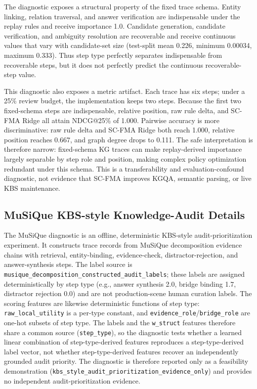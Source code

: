 \documentclass[a4paper,fleqn]{cas-sc}
\begin{document}
The diagnostic exposes a structural property of the fixed trace schema. Entity linking, relation traversal, and answer verification are indispensable under the replay rules and receive importance 1.0. Candidate generation, candidate verification, and ambiguity resolution are recoverable and receive continuous values that vary with candidate-set size (test-split mean 0.226, minimum 0.00034, maximum 0.333). Thus step type perfectly separates indispensable from recoverable steps, but it does not perfectly predict the continuous recoverable-step value.

This diagnostic also exposes a metric artifact. Each trace has six steps; under a 25\% review budget, the implementation keeps two steps. Because the first two fixed-schema steps are indispensable, relative position, raw rule delta, and SC-FMA Ridge all attain NDCG@25\% of 1.000. Pairwise accuracy is more discriminative: raw rule delta and SC-FMA Ridge both reach 1.000, relative position reaches 0.667, and graph degree drops to 0.111. The safe interpretation is therefore narrow: fixed-schema KG traces can make replay-derived importance largely separable by step role and position, making complex policy optimization redundant under this schema. This is a transferability and evaluation-confound diagnostic, not evidence that SC-FMA improves KGQA, semantic parsing, or live KBS maintenance.

\subsection{MuSiQue KBS-style Knowledge-Audit Details}
\label{app:musique-kbs-audit}

The MuSiQue diagnostic is an offline, deterministic KBS-style audit-prioritization experiment. It constructs trace records from MuSiQue decomposition evidence chains with retrieval, entity-binding, evidence-check, distractor-rejection, and answer-synthesis steps. The label source is \texttt{musique\_decomposition\_constructed\_audit\_labels}; these labels are assigned deterministically by step type (e.g., answer synthesis 2.0, bridge binding 1.7, distractor rejection 0.0) and are not production-scene human curation labels. The scoring features are likewise deterministic functions of step type: \texttt{raw\_local\_utility} is a per-type constant, and \texttt{evidence\_role}/\texttt{bridge\_role} are one-hot subsets of step type. The labels and the \texttt{w\_struct} features therefore share a common source (\texttt{step\_type}), so the diagnostic tests whether a learned linear combination of step-type-derived features reproduces a step-type-derived label vector, not whether step-type-derived features recover an independently grounded audit priority. The diagnostic is therefore reported only as a feasibility demonstration (\texttt{kbs\_style\_audit\_prioritization\_evidence\_only}) and provides no independent audit-prioritization evidence.
\end{document}
